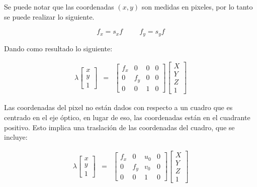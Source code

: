 Se puede notar que las coordenadas $(x,y)$ son medidas en pixeles, por lo tanto se puede realizar lo siguiente.

\begin{equation}
    f_x=s_x f \hspace{1cm} f_y = s_y f
\end{equation}

Dando como resultado lo siguiente:

\begin{equation}
\begin{aligned}
\lambda\left[\begin{array}{cc}x\\y\\1\end{array}\right]
 & = & \left[\begin{array}{cccc}
f_x & 0 & 0 & 0\\
0 & f_y & 0 & 0\\
0 & 0 & 1 & 0
\end{array}\right]
\left[\begin{array}{c}X\\Y\\Z\\1\end{array}\right]
\end{aligned}
\label{eq:ProyMatrix_3}
\end{equation}  

Las coordenadas del pixel no están dados con respecto a un cuadro que es centrado en el eje óptico, en lugar de eso, las coordenadas están en el cuadrante positivo. Esto implica una traslación de las coordenadas del cuadro, que se incluye:

\begin{equation}
\begin{aligned}
\lambda\left[\begin{array}{cc}x\\y\\1\end{array}\right]
 & = & \left[\begin{array}{cccc}
f_x & 0 & u_0 & 0\\
0 & f_y & v_0 & 0\\
0 & 0 & 1 & 0
\end{array}\right]
\left[\begin{array}{c}X\\Y\\Z\\1\end{array}\right]
\end{aligned}
\label{eq:ProyMatrix_4}
\end{equation}  

